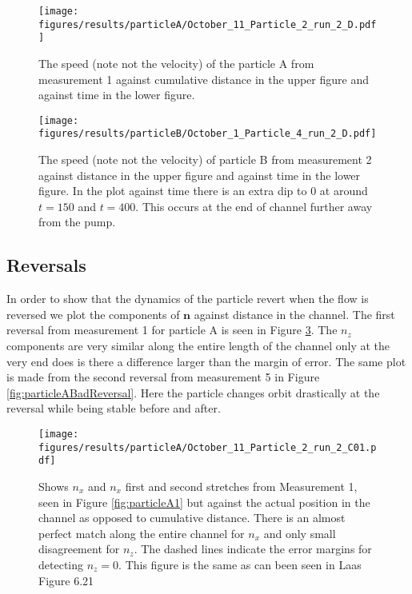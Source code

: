 \begin{figure}[H]
\begin{center}
\texttt{[image: figures/results/particleA/October\_11\_Particle\_2\_run\_2\_D.pdf]}
\end{center}
\caption{The speed (note not the velocity) of the particle A from measurement 1 against cumulative distance in the upper figure and against time in the lower figure.}
\label{fig:particleAspeed}
\end{figure}


\begin{figure}[H]
\begin{center}
\texttt{[image: figures/results/particleB/October\_1\_Particle\_4\_run\_2\_D.pdf]}
\end{center}
\caption{The speed (note not the velocity) of particle B from measurement 2 against distance in the upper figure and against time in the lower figure. In the plot against time there is an extra dip to 0 at around $t=150$ and $t=400$. This occurs at the end of channel further away from the pump.}
\label{fig:particleB1speed}
\end{figure}


\subsection{Reversals}
In order to show that the dynamics of the particle revert when the flow is reversed we plot the components of $\mathbf{n}$ against distance in the channel. The first reversal from measurement 1 for particle A is seen in Figure \ref{fig:particleAreversegood}. The $n_z$ components are very similar along the entire length of the channel only at the very end does is there a difference larger than the margin of error. The same plot is made from the second reversal from measurement 5 in Figure \ref{fig:particleABadReversal}. Here the particle changes orbit drastically at the reversal while being stable before and after. 

\begin{figure}[H]
\begin{center}
\texttt{[image: figures/results/particleA/October\_11\_Particle\_2\_run\_2\_C01.pdf]}
\end{center}
\caption{Shows $n_x$ and $n_x$ first and second stretches from Measurement 1, seen in Figure \ref{fig:particleA1} but against the actual position in the channel as opposed to cumulative distance. There is an almost perfect match along the entire channel for $n_x$ and only small disagreement for $n_z$. The dashed lines indicate the error margins for detecting $n_z=0$. This figure is the same as can been seen in Laas\cite{alexanderThesis} Figure 6.21}
\label{fig:particleAreversegood}
\end{figure}

